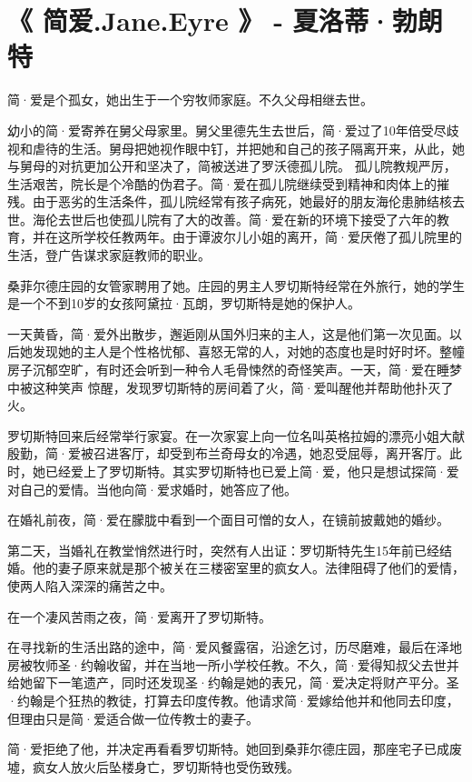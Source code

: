 \documentclass[UTF8,a4paper,8pt]{ctexart}
\begin{document}
 \newpage
 \section{《 简爱.Jane.Eyre 》 - 夏洛蒂·勃朗特}
 简·爱是个孤女，她出生于一个穷牧师家庭。不久父母相继去世。
 
 幼小的简·爱寄养在舅父母家里。舅父里德先生去世后，简·爱过了10年倍受尽歧视和虐待的生活。舅母把她视作眼中钉，并把她和自己的孩子隔离开来，从此，她与舅母的对抗更加公开和坚决了，简被送进了罗沃德孤儿院。
 孤儿院教规严厉，生活艰苦，院长是个冷酷的伪君子。简·爱在孤儿院继续受到精神和肉体上的摧残。由于恶劣的生活条件，孤儿院经常有孩子病死，她最好的朋友海伦患肺结核去世。海伦去世后也使孤儿院有了大的改善。简·爱在新的环境下接受了六年的教育，并在这所学校任教两年。由于谭波尔儿小姐的离开，简·爱厌倦了孤儿院里的生活，登广告谋求家庭教师的职业。
 
 桑菲尔德庄园的女管家聘用了她。庄园的男主人罗切斯特经常在外旅行，她的学生是一个不到10岁的女孩阿黛拉·瓦朗，罗切斯特是她的保护人。
 
 一天黄昏，简·爱外出散步，邂逅刚从国外归来的主人，这是他们第一次见面。以后她发现她的主人是个性格忧郁、喜怒无常的人，对她的态度也是时好时坏。整幢房子沉郁空旷，有时还会听到一种令人毛骨悚然的奇怪笑声。一天，简·爱在睡梦中被这种笑声
 惊醒，发现罗切斯特的房间着了火，简·爱叫醒他并帮助他扑灭了火。
 
 罗切斯特回来后经常举行家宴。在一次家宴上向一位名叫英格拉姆的漂亮小姐大献殷勤，简·爱被召进客厅，却受到布兰奇母女的冷遇，她忍受屈辱，离开客厅。此时，她已经爱上了罗切斯特。其实罗切斯特也已爱上简·爱，他只是想试探简·爱对自己的爱情。当他向简·爱求婚时，她答应了他。
 
 在婚礼前夜，简·爱在朦胧中看到一个面目可憎的女人，在镜前披戴她的婚纱。
 
 第二天，当婚礼在教堂悄然进行时，突然有人出证：罗切斯特先生15年前已经结婚。他的妻子原来就是那个被关在三楼密室里的疯女人。法律阻碍了他们的爱情，使两人陷入深深的痛苦之中。
 
 在一个凄风苦雨之夜，简·爱离开了罗切斯特。
 
 在寻找新的生活出路的途中，简·爱风餐露宿，沿途乞讨，历尽磨难，最后在泽地房被牧师圣·约翰收留，并在当地一所小学校任教。不久，简·爱得知叔父去世并给她留下一笔遗产，同时还发现圣·约翰是她的表兄，简·爱决定将财产平分。圣·约翰是个狂热的教徒，打算去印度传教。他请求简·爱嫁给他并和他同去印度，但理由只是简·爱适合做一位传教士的妻子。
 
 简·爱拒绝了他，并决定再看看罗切斯特。她回到桑菲尔德庄园，那座宅子已成废墟，疯女人放火后坠楼身亡，罗切斯特也受伤致残。
 
\end{document}

